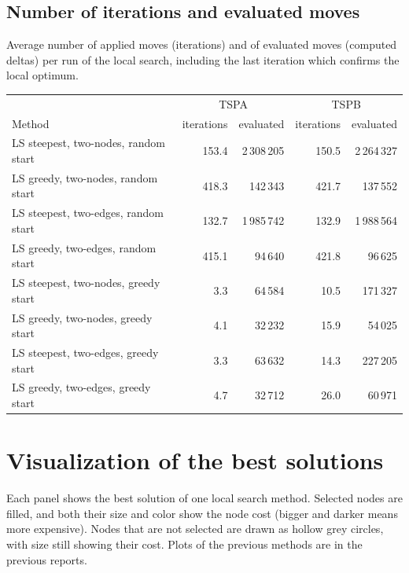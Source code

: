 \documentclass[11pt,a4paper]{article}
\begin{document}
\subsection*{Number of iterations and evaluated moves}
Average number of applied moves (iterations) and of evaluated moves (computed deltas) per run of the
local search, including the last iteration which confirms the local optimum.
\begin{table}[H]
\centering
\small
\begin{tabular}{lrrrr}
\toprule
 & \multicolumn{2}{c}{TSPA} & \multicolumn{2}{c}{TSPB} \\
Method & iterations & evaluated & iterations & evaluated \\
\midrule
LS steepest, two-nodes, random start & 153.4 & 2\,308\,205 & 150.5 & 2\,264\,327 \\
LS greedy, two-nodes, random start & 418.3 & 142\,343 & 421.7 & 137\,552 \\
LS steepest, two-edges, random start & 132.7 & 1\,985\,742 & 132.9 & 1\,988\,564 \\
LS greedy, two-edges, random start & 415.1 & 94\,640 & 421.8 & 96\,625 \\
LS steepest, two-nodes, greedy start & 3.3 & 64\,584 & 10.5 & 171\,327 \\
LS greedy, two-nodes, greedy start & 4.1 & 32\,232 & 15.9 & 54\,025 \\
LS steepest, two-edges, greedy start & 3.3 & 63\,632 & 14.3 & 227\,205 \\
LS greedy, two-edges, greedy start & 4.7 & 32\,712 & 26.0 & 60\,971 \\
\bottomrule
\end{tabular}
\end{table}
\section{Visualization of the best solutions}
Each panel shows the best solution of one local search method. Selected nodes are filled, and both
their size and color show the node cost (bigger and darker means more expensive). Nodes that are not
selected are drawn as hollow grey circles, with size still showing their cost. Plots of the previous
methods are in the previous reports.
\end{document}
